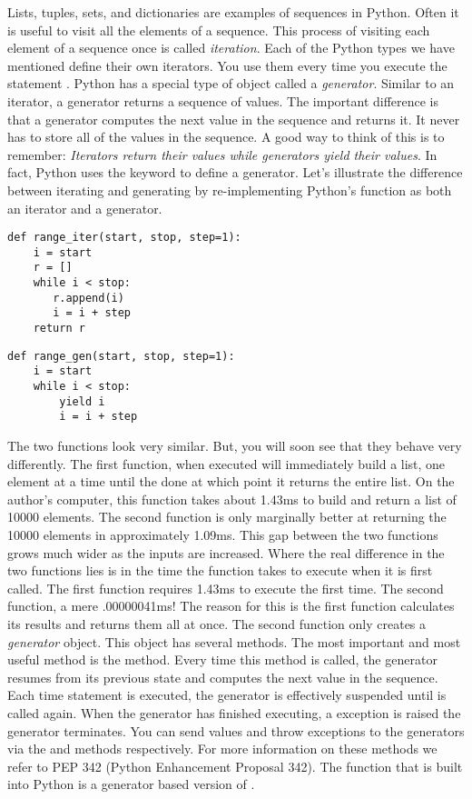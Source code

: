 \label{lab:Python_Generators}

Lists, tuples, sets, and dictionaries are examples of sequences in Python.
Often it is useful to visit all the elements of a sequence.  This process of visiting
each element of a sequence once is called \emph{iteration}. 
Each of the Python types we have mentioned define their own iterators.
You use them every time you execute the statement .
Python has a special type of object called a \emph{generator}.
Similar to an iterator, a generator returns a sequence of values.
The important difference is that a generator computes the next value in the sequence and returns it.
It never has to store all of the values in the sequence.
A good way to think of this is to remember: \emph{Iterators return their values while generators yield their values}.
In fact, Python uses the  keyword to define a generator.
Let's illustrate the difference between iterating and generating by re-implementing Python's  function
as both an iterator and a generator.
\begin{lstlisting}
def range_iter(start, stop, step=1):
    i = start
    r = []
    while i < stop:
       r.append(i)
       i = i + step
    return r
\end{lstlisting}
\begin{lstlisting}
def range_gen(start, stop, step=1):
    i = start
    while i < stop:
        yield i
        i = i + step
\end{lstlisting}
The two functions look very similar.  But, you will soon see that they behave very differently.
The first function, when executed will immediately build a list, one element at a time until the done
at which point it returns the entire list.  On the author's computer, this function takes about 1.43ms
to build and return a list of 10000 elements.  The second function is only marginally better at
returning the 10000 elements in approximately 1.09ms.  
This gap between the two functions grows much wider as the inputs are increased.
Where the real difference in the two functions lies is in the time the function takes to execute when
it is first called.  The first function requires 1.43ms to execute the first time.  The second function,
a mere .00000041ms!  The reason for this is the first function calculates its results and returns them all at once.  The second function only creates a \emph{generator} object.  This object has several methods.
The most important and most useful method is the  method.  Every time this method is called, 
the generator resumes from its previous state and computes the next value in the sequence. Each time  statement is executed, the generator is effectively suspended until  is called again.
When the generator has finished executing, a  exception is raised the generator terminates.
You can send values and throw exceptions to the generators via the  and  methods respectively.
For more information on these methods we refer to PEP 342 (Python Enhancement Proposal 342).
The  function that is built into Python is a generator based version of .

